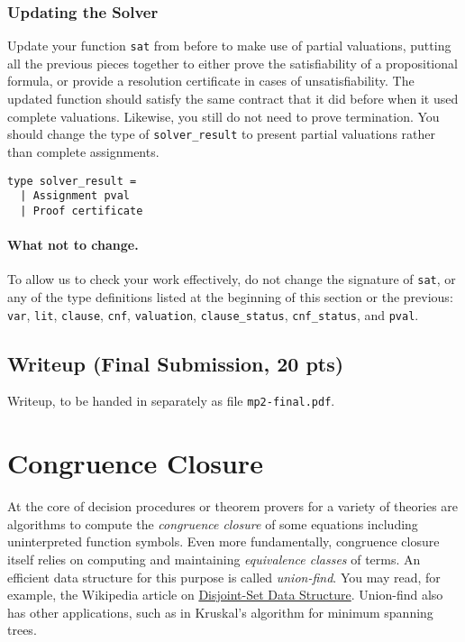 \documentclass[11pt]{article}
\begin{document}
\subsubsection*{Updating the Solver}

\begin{task}[25 pts] Update your function \verb|sat| from before to make use of partial valuations, putting all the previous pieces together to either prove the satisfiability of a propositional formula, or provide a resolution certificate in cases of unsatisfiability.  
The updated function should satisfy the same contract that it did before when it used complete valuations.
Likewise, you still do not need to prove termination.
You should change the type of \verb'solver_result' to present partial valuations rather than complete assignments.
\begin{lstlisting}
type solver_result =
  | Assignment pval
  | Proof certificate
\end{lstlisting}
\end{task}

\paragraph{What not to change.} To allow us to check your work effectively, do not change the signature of \verb'sat', or any of the type definitions listed at the beginning of this section or the previous: \verb'var', \verb'lit', \verb'clause', \verb'cnf', \verb'valuation', \verb'clause_status', \verb'cnf_status', and \verb'pval'.

\subsection{Writeup (Final Submission, 20 pts)}

\begin{task}[20 pts]
Writeup, to be handed in separately as file \verb|mp2-final.pdf|.  
\end{task}

\clearpage
\section{Congruence Closure}
\setcounter{task}{0}

At the core of decision procedures or theorem provers for a variety of
theories are algorithms to compute the \emph{congruence closure} of
some equations including uninterpreted function symbols.  Even more
fundamentally, congruence closure itself relies on computing and
maintaining \emph{equivalence classes} of terms.  An efficient data
structure for this purpose is called \emph{union-find}.  You may read,
for example, the Wikipedia article on
\href{https://en.wikipedia.org/wiki/Disjoint-set_data_structure}{Disjoint-Set
  Data Structure}.  Union-find also has other applications, such as in
Kruskal's algorithm for minimum spanning trees.
\end{document}
